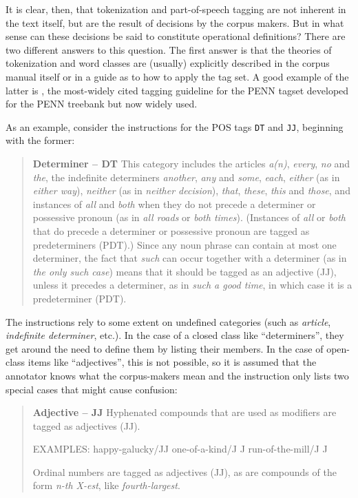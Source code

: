 It is clear, then, that tokenization and part-of-speech tagging are not inherent in the text itself, but are the result of decisions by the corpus makers. But in what sense can these decisions be said to constitute operational definitions? There are two different answers to this question. The first answer is that the theories of tokenization and word classes are (usually) explicitly described in the corpus manual itself or in a guide as to how to apply the tag set. A good example of the latter is \citet{santorini_part--speech_1990}, the most-widely cited tagging guideline for the PENN tagset developed for the PENN treebank but now widely used.

As an example, consider the instructions for the POS tags \texttt{DT} and \texttt{JJ}, beginning with the former:

\begin{quote}
\textbf{Determiner -- DT}
This category includes the articles \textit{a(n)}, \textit{every}, \textit{no} and \textit{the}, the indefinite determiners \textit{another}, \textit{any} and \textit{some}, \textit{each}, \textit{either} (as in \textit{either way}), \textit{neither} (as in \textit{neither decision}), \textit{that}, \textit{these}, \textit{this} and \textit{those}, and instances of \textit{all} and \textit{both} when they do not precede a determiner or possessive pronoun (as in \textit{all roads} or \textit{both times}). (Instances of \textit{all} or \textit{both} that do precede a determiner or possessive pronoun are tagged as predeterminers (PDT).) Since any noun phrase can contain at most one determiner, the fact that \textit{such} can occur together with a determiner (as in\textit{ the only such case}) means that it should be tagged as an adjective (JJ), unless it precedes a determiner, as in \textit{such a good time}, in which case it is a predeterminer (PDT). \citep[2]{santorini_part--speech_1990}
\end{quote}

The instructions rely to some extent on undefined categories (such as \textit{article}, \textit{indefinite determiner}, etc.). In the case of a closed class like ``determiners'', they get around the need to define them by listing their members. In the case of open-class items like ``adjectives'', this is not possible, so it is assumed that the annotator knows what the corpus-makers mean and the instruction only lists two special cases that might cause confusion:

\begin{quote}
\textbf{Adjective -- JJ}
Hyphenated compounds that are used as modifiers are tagged as adjectives (JJ).

EXAMPLES: happy-galucky/JJ one-of-a-kind/J J
run-of-the-mill/J J

Ordinal numbers are tagged as adjectives (JJ), as are compounds of the form \textit{n-th X-est}, like \textit{fourth-largest}. \citep[1]{santorini_part--speech_1990}
\end{quote}

